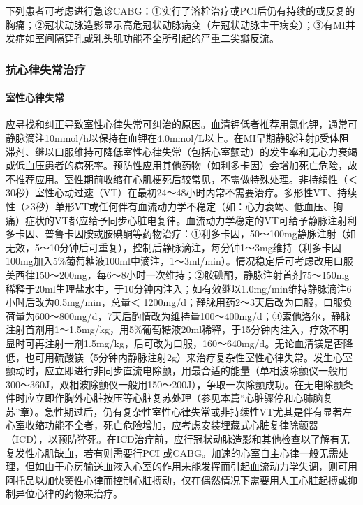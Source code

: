 下列患者可考虑进行急诊CABG：①实行了溶栓治疗或PCI后仍有持续的或反复的胸痛；②冠状动脉造影显示高危冠状动脉病变（左冠状动脉主干病变）；③有MI并发症如室间隔穿孔或乳头肌功能不全所引起的严重二尖瓣反流。

\subsubsection{抗心律失常治疗}

\paragraph{室性心律失常}

应寻找和纠正导致室性心律失常可纠治的原因。血清钾低者推荐用氯化钾，通常可静脉滴注10mmol/h以保持在血钾在4.0mmol/L以上。在MI早期静脉注射β受体阻滞剂、继以口服维持可降低室性心律失常（包括心室颤动）的发生率和无心力衰竭或低血压患者的病死率。预防性应用其他药物（如利多卡因）会增加死亡危险，故不推荐应用。室性期前收缩在心肌梗死后较常见，不需做特殊处理。非持续性（＜
30秒）室性心动过速（VT）在最初24～48小时内常不需要治疗。多形性VT、持续性（≥3秒）单形VT或任何伴有血流动力学不稳定（如：心力衰竭、低血压、胸痛）症状的VT都应给予同步心脏电复律。血流动力学稳定的VT可给予静脉注射利多卡因、普鲁卡因胺或胺碘酮等药物治疗：①利多卡因，50～100mg静脉注射（如无效，5～10分钟后可重复），控制后静脉滴注，每分钟1～3mg维持（利多卡因100mg加入5\%葡萄糖液100ml中滴注，1～3ml/min）。情况稳定后可考虑改用口服美西律150～200mg，每6～8小时一次维持；②胺碘酮，静脉注射首剂75～150mg稀释于20ml生理盐水中，于10分钟内注入；如有效继以1.0mg/min维持静脉滴注6小时后改为0.5mg/min，总量＜
1200mg/d；静脉用药2～3天后改为口服，口服负荷量为600～800mg/d，7天后酌情改为维持量100～400mg/d；③索他洛尔，静脉注射首剂用1～1.5mg/kg，用5\%葡萄糖液20ml稀释，于15分钟内注入，疗效不明显时可再注射一剂1.5mg/kg，后可改为口服，160～640mg/d。无论血清镁是否降低，也可用硫酸镁（5分钟内静脉注射2g）来治疗复杂性室性心律失常。发生心室颤动时，应立即进行非同步直流电除颤，用最合适的能量（单相波除颤仪一般用300～360J，双相波除颤仪一般用150～200J），争取一次除颤成功。在无电除颤条件时应立即作胸外心脏按压等心脏复苏处理（参见本篇“心脏骤停和心肺脑复苏”章）。急性期过后，仍有复杂性室性心律失常或非持续性VT尤其是伴有显著左心室收缩功能不全者，死亡危险增加，应考虑安装埋藏式心脏复律除颤器（ICD），以预防猝死。在ICD治疗前，应行冠状动脉造影和其他检查以了解有无复发性心肌缺血，若有则需要行PCI
或CABG。加速的心室自主心律一般无需处理，但如由于心房输送血液入心室的作用未能发挥而引起血流动力学失调，则可用阿托品以加快窦性心律而控制心脏搏动，仅在偶然情况下需要用人工心脏起搏或抑制异位心律的药物来治疗。

